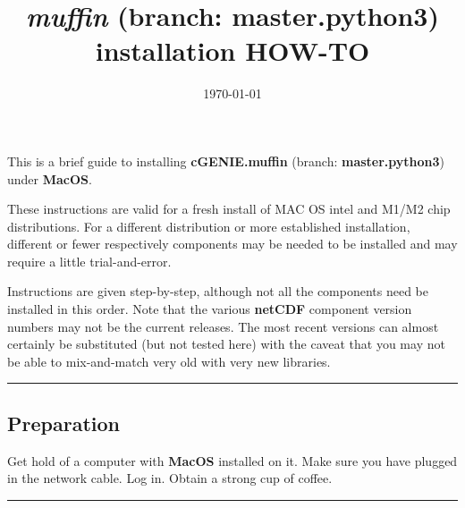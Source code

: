 \documentclass[10pt,twoside]{article}
\title{\textit{muffin} (branch: \textbf{master.python3}) installation HOW-TO\vspace{-8mm}}
\author{}
\date{\today}
\begin{document}

\maketitle


\noindent This is a brief guide to installing \textbf{cGENIE.muffin} (branch: \textbf{master.python3}) under \textbf{MacOS}. 

These instructions are valid for a fresh install of MAC OS intel and M1/M2 chip distributions. For a different distribution or more established installation, different or fewer respectively components may be needed to be installed and may require a little trial-and-error.

Instructions are given step-by-step, although not all the components need be installed in this order. Note that the various \textbf{netCDF} component version numbers may not be the current releases. The most recent versions can almost certainly be substituted (but not tested here) with the caveat that you may not be able to mix-and-match very old with very new libraries.

\vspace{1mm}\noindent\rule{4cm}{0.1mm}

\subsection{Preparation}
\vspace{1mm}

Get hold of a computer with \textbf{MacOS} installed on it. Make sure you have plugged in the network cable. Log in. Obtain a strong cup of coffee.

\vspace{1mm}\noindent\rule{4cm}{0.1mm}
\end{document}
